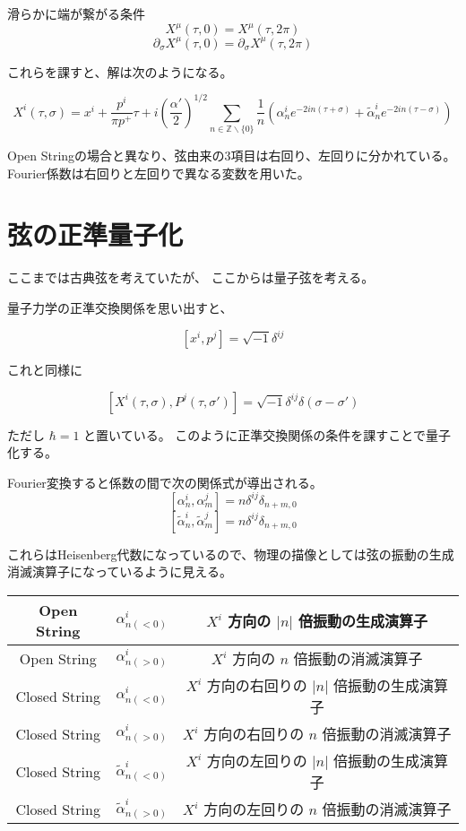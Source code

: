 \documentclass[uplatex]{jsarticle}
\begin{document}
滑らかに端が繋がる条件
$$
	X^{\mu}(\tau, 0)
	=
	X^{\mu}(\tau, 2 \pi)
$$
$$
	\partial_{\sigma} X^{\mu}(\tau, 0)
	=
	\partial_{\sigma} X^{\mu}(\tau, 2 \pi)
$$

これらを課すと、解は次のようになる。

$$
	X^{i}(\tau, \sigma)
	=
	x^{i} + \frac{p^{i}}{\pi p^{+}} \tau
	+
	i \left( \frac{\alpha'}{2} \right)^{1/2} \sum_{n \in \mathbb{Z} \backslash \{ 0 \} }
	\frac{1}{n}
	\left(
	\alpha^{i}_{n} e^{- 2 i n (\tau + \sigma) }
	+
	\tilde{\alpha}^{i}_{n} e^{- 2 i n (\tau - \sigma) }
	\right)
$$

Open Stringの場合と異なり、弦由来の3項目は右回り、左回りに分かれている。
Fourier係数は右回りと左回りで異なる変数を用いた。

\section{弦の正準量子化}

ここまでは古典弦を考えていたが、
ここからは量子弦を考える。

量子力学の正準交換関係を思い出すと、

$$
	[x^{i} , p^{j}] = \sqrt{-1} \delta^{ij}
$$

これと同様に

$$
	[X^{i}(\tau, \sigma) , P^{j}(\tau, \sigma')] = \sqrt{-1} \delta^{ij} \delta(\sigma - \sigma')
$$

ただし
$\hbar=1$
と置いている。
このように正準交換関係の条件を課すことで量子化する。

Fourier変換すると係数の間で次の関係式が導出される。
$$
	[\alpha^{i}_{n} , \alpha^{j}_{m}] = n \delta^{ij} \delta_{n+m, 0}
$$
$$
	[ \tilde{\alpha}^{i}_{n} , \tilde{\alpha}^{j}_{m}] = n \delta^{ij} \delta_{n+m, 0}
$$

これらはHeisenberg代数になっているので、物理の描像としては弦の振動の生成消滅演算子になっているように見える。

\begin{table}[H]
	\centering
	\begin{tabular}{|c|c|c|}
		\hline
		Open String   & $\alpha^{i}_{n(<0)}$         & $X^{i}$ 方向の $|n|$ 倍振動の生成演算子     \\ \hline
		Open String   & $\alpha^{i}_{n(>0)}$         & $X^{i}$ 方向の $n$ 倍振動の消滅演算子       \\ \hline
		Closed String & $\alpha^{i}_{n(<0)}$         & $X^{i}$ 方向の右回りの $|n|$ 倍振動の生成演算子 \\ \hline
		Closed String & $\alpha^{i}_{n(>0)}$         & $X^{i}$ 方向の右回りの $n$ 倍振動の消滅演算子   \\ \hline
		Closed String & $\tilde{\alpha}^{i}_{n(<0)}$ & $X^{i}$ 方向の左回りの $|n|$ 倍振動の生成演算子 \\ \hline
		Closed String & $\tilde{\alpha}^{i}_{n(>0)}$ & $X^{i}$ 方向の左回りの $n$ 倍振動の消滅演算子   \\ \hline
	\end{tabular}
\end{table}
\end{document}

